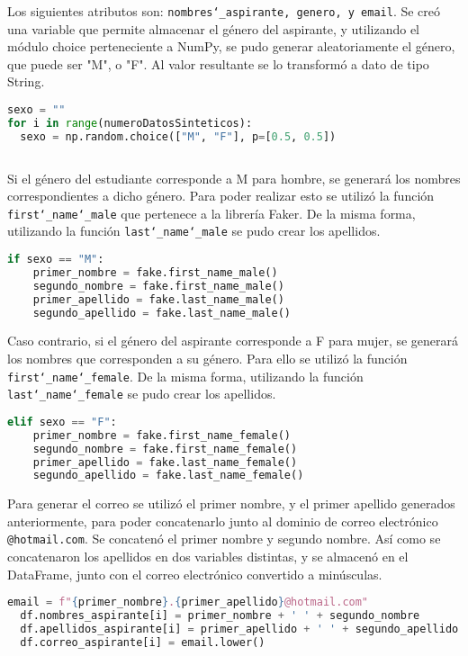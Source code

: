 \documentclass[10pt, oneside,spanish]{article}   	%
\begin{document}
Los siguientes atributos son: \texttt{nombres\char`_aspirante, genero, y email}. Se creó una variable que permite almacenar el género del aspirante, y utilizando el módulo choice perteneciente a NumPy, se pudo generar aleatoriamente el género, que puede ser "M", o "F". Al valor resultante se lo transformó a dato de tipo String. 
\begin{lstlisting}[language=Python, caption=Python example,numbers=none,xleftmargin=.15in,xrightmargin=.15in]  
sexo = ""
for i in range(numeroDatosSinteticos):
  sexo = np.random.choice(["M", "F"], p=[0.5, 0.5])
 
\end{lstlisting}
Si el género del estudiante corresponde a M para hombre, se generará los nombres correspondientes a dicho género. Para poder realizar esto se utilizó la función \texttt{first\char`_name\char`_male} que pertenece a la librería Faker. De la misma forma, utilizando la función \texttt{last\char`_name\char`_male} se pudo crear los apellidos. 
\begin{lstlisting}[language=Python, caption=Python example,numbers=none,xleftmargin=.15in,xrightmargin=.15in]  
  if sexo == "M":
    primer_nombre = fake.first_name_male()
    segundo_nombre = fake.first_name_male()
    primer_apellido = fake.last_name_male()
    segundo_apellido = fake.last_name_male()
\end{lstlisting}
Caso contrario, si el género del aspirante corresponde a F para mujer, se generará los nombres que corresponden a su género. Para ello se utilizó la función \texttt{first\char`_name\char`_female}. De la misma forma, utilizando la función \texttt{last\char`_name\char`_female} se pudo crear los apellidos. 
\begin{lstlisting}[language=Python, caption=Python example,numbers=none,xleftmargin=.15in,xrightmargin=.15in]  
  elif sexo == "F":
    primer_nombre = fake.first_name_female()
    segundo_nombre = fake.first_name_female()
    primer_apellido = fake.last_name_female()
    segundo_apellido = fake.last_name_female()
\end{lstlisting}
Para generar el correo se utilizó el primer nombre, y el primer apellido generados anteriormente, para poder concatenarlo junto al dominio de correo electrónico \texttt{@hotmail.com}. Se concatenó el primer nombre y segundo nombre. Así como se concatenaron los apellidos en dos variables distintas, y se almacenó en el DataFrame, junto con el correo electrónico convertido a minúsculas. 
\begin{lstlisting}[language=Python, caption=Python example,numbers=none,xleftmargin=.15in,xrightmargin=.15in]  
 email = f"{primer_nombre}.{primer_apellido}@hotmail.com"
  df.nombres_aspirante[i] = primer_nombre + ' ' + segundo_nombre
  df.apellidos_aspirante[i] = primer_apellido + ' ' + segundo_apellido
  df.correo_aspirante[i] = email.lower()
 \end{lstlisting}
\end{document}
